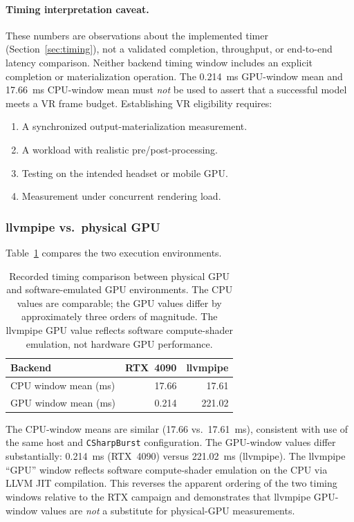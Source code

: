 \documentclass[10pt,twocolumn]{article}
\begin{document}
\paragraph{Timing interpretation caveat.}
These numbers are observations about the implemented timer (Section~\ref{sec:timing}), not a validated completion, throughput, or end-to-end latency comparison. Neither backend timing window includes an explicit completion or materialization operation. The 0.214~ms GPU-window mean and 17.66~ms CPU-window mean must \emph{not} be used to assert that a successful model meets a VR frame budget. Establishing VR eligibility requires:
\begin{enumerate}[nosep,leftmargin=*]
  \item A synchronized output-materialization measurement.
  \item A workload with realistic pre/post-processing.
  \item Testing on the intended headset or mobile GPU.
  \item Measurement under concurrent rendering load.
\end{enumerate}

\TimingFigure

\subsubsection{llvmpipe vs.\ physical GPU}

Table~\ref{tab:llvmpipe} compares the two execution environments.

\begin{table}[t]
\centering\small
\begin{tabular}{lrr}
\toprule
Backend & RTX~4090 & llvmpipe \\
\midrule
CPU window mean (ms) & 17.66 & 17.61 \\
GPU window mean (ms) & 0.214 & 221.02 \\
\bottomrule
\end{tabular}
\caption{Recorded timing comparison between physical GPU and software-emulated GPU environments. The CPU values are comparable; the GPU values differ by approximately three orders of magnitude. The llvmpipe GPU value reflects software compute-shader emulation, not hardware GPU performance.}
\label{tab:llvmpipe}
\end{table}

The CPU-window means are similar (17.66 vs.\ 17.61~ms), consistent with use of the same host and \texttt{CSharpBurst} configuration. The GPU-window values differ substantially: 0.214~ms (RTX~4090) versus 221.02~ms (llvmpipe). The llvmpipe ``GPU'' window reflects software compute-shader emulation on the CPU via LLVM JIT compilation. This reverses the apparent ordering of the two timing windows relative to the RTX campaign and demonstrates that llvmpipe GPU-window values are \emph{not} a substitute for physical-GPU measurements.
\end{document}
